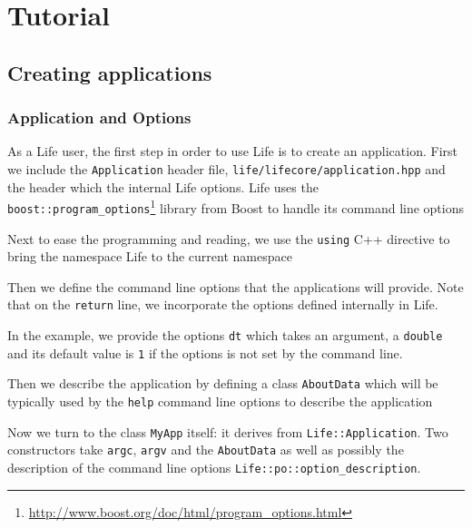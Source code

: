 \documentclass[a4paper]{book}
\newcommand{\cpp}{C{\hspace{-.3em}\vspace{-.2em}\tiny++}\xspace}
\begin{document}
\chapter{Tutorial}
\label{sec:tutorial}


\section{Creating applications}
\label{sec:creat-appl}



\subsection{Application and Options}
\label{sec:options}

As a Life user, the first step in order to use Life is to create an
application. First we include the \lstinline!Application! header file,
\lstinline!life/lifecore/application.hpp! and the header which the
internal Life options. Life uses the
\lstinline!boost::program_options!\footnote{\url{http://www.boost.org/doc/html/program_options.html}}
library from Boost to handle its command line options




Next to ease the programming and reading, we use the \lstinline!using!
\cpp directive to bring the namespace Life to the current namespace



Then we define the command line options that the applications will
provide. Note that on the \lstinline!return! line, we incorporate the
options defined internally in Life.



In the example, we provide the options \lstinline!dt! which takes an
argument, a \lstinline!double! and its default value is \lstinline!1!
if the options is not set by the command line.

Then we describe the application by defining a class
\lstinline!AboutData! which will be typically used by the
\lstinline!help! command line options to describe the application





Now we turn to the class \lstinline!MyApp! itself: it derives from
\lstinline!Life::Application!. Two constructors take \lstinline!argc!,
\lstinline!argv! and the \lstinline!AboutData! as well as possibly the
description of the command line options \lstinline!Life::po::option_description!.
\end{document}
